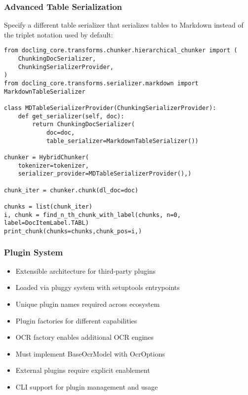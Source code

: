 \begin{frame}[fragile]\frametitle{Advanced Table Serialization}
Specify a different table serializer that serializes tables to Markdown instead of the triplet notation used by default:
	  
\begin{lstlisting}
from docling_core.transforms.chunker.hierarchical_chunker import (
    ChunkingDocSerializer,
    ChunkingSerializerProvider,
)
from docling_core.transforms.serializer.markdown import MarkdownTableSerializer

class MDTableSerializerProvider(ChunkingSerializerProvider):
    def get_serializer(self, doc):
        return ChunkingDocSerializer(
            doc=doc,
            table_serializer=MarkdownTableSerializer())

chunker = HybridChunker(
    tokenizer=tokenizer,
    serializer_provider=MDTableSerializerProvider(),)

chunk_iter = chunker.chunk(dl_doc=doc)

chunks = list(chunk_iter)
i, chunk = find_n_th_chunk_with_label(chunks, n=0, label=DocItemLabel.TABL)
print_chunk(chunks=chunks,chunk_pos=i,)
\end{lstlisting}		  
\end{frame}

\begin{frame}[fragile]\frametitle{Plugin System}
      \begin{itemize}
	\item Extensible architecture for third-party plugins
	\item Loaded via pluggy system with setuptools entrypoints
	\item Unique plugin names required across ecosystem
	\item Plugin factories for different capabilities
	\item OCR factory enables additional OCR engines
	\item Must implement BaseOcrModel with OcrOptions
	\item External plugins require explicit enablement
	\item CLI support for plugin management and usage
	  \end{itemize}
\end{frame}

